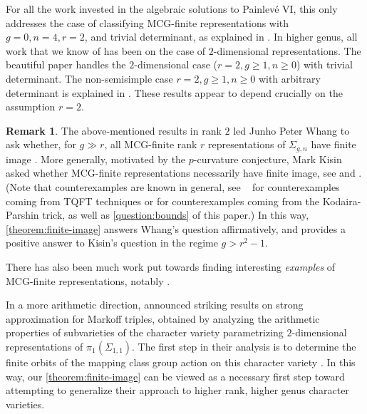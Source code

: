 \documentclass[12 pt]{amsart}
\theoremstyle{plain}
\theoremstyle{definition}
\newtheorem{remark}[subsubsection]{Remark}
\theoremstyle{remark}
\numberwithin{equation}{section}
\begin{document}
For all the work invested in the algebraic solutions to Painlev\'e VI, this only
addresses the case of classifying  MCG-finite representations with $g = 0, n = 4,
r = 2$, and trivial determinant, as explained in \cite{lisovyy2014algebraic}.
In higher genus, all work that we know of has been on the case of
$2$-dimensional representations.
The beautiful paper \cite{biswas2017surface} handles the $2$-dimensional case ($r = 2, g \geq 1, n \geq 0$) with trivial
determinant.
The non-semisimple case $r = 2, g \geq 1, n \geq 0$ with arbitrary determinant
is explained in \cite[Theorem B]{CH:isomonodromic}.
These results appear to depend crucially on the assumption $r=2$.

\begin{remark}
	\label{remark:}
	The above-mentioned results in rank $2$ led Junho Peter Whang to ask whether, for $g\gg r$, all MCG-finite rank $r$ representations of $\Sigma_{g,n}$
have finite image \cite[Question 1.5.3]{lawrence2019representations}.
More generally, motivated by the $p$-curvature conjecture, Mark Kisin asked whether MCG-finite representations
necessarily have finite image,
see \cite[p. 3]{biswas2017surface} and \cite[p. 1]{sinz:thesis}. (Note that
counterexamples are known in general, see ~\cite[Theorem
5.1]{biswas2018representations} for counterexamples coming from TQFT techniques or 
\cite[Example 3.3.1]{lawrence2019representations} for counterexamples coming
from the Kodaira-Parshin trick, as well as
\autoref{question:bounds} of this paper.)
In this way, \autoref{theorem:finite-image} answers Whang's question
affirmatively, and provides a positive answer to Kisin's question in the regime
$g > r^2-1$.
\end{remark}

There has also been much work put towards finding interesting \emph{examples} of MCG-finite representations, notably \cite{doran:isomonodromic, diarra2013construction, girand:a-new-two-parameter-family, diarra2015ramified, girand2016algebraic}. 

In a more arithmetic direction, \cite{bourgainGS:announcement} 
announced striking results on strong approximation for Markoff triples, obtained by analyzing the
arithmetic properties of subvarieties of the character variety parametrizing $2$-dimensional
representations of $\pi_1(\Sigma_{1,1})$.
The first step in their analysis is to determine the finite orbits of the
mapping class group action on this character variety \cite[last paragraph of p.
132]{bourgainGS:announcement}.
In this way, our \autoref{theorem:finite-image} can be viewed as a necessary
first step 
toward attempting to generalize their approach to 
higher rank, higher genus character
varieties.
\end{document}
